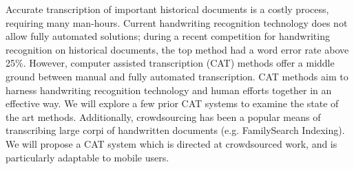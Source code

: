 \documentclass[conference]{IEEEtran}
\begin{document}




\maketitle






%
\IEEEpeerreviewmaketitle



Accurate transcription of important historical documents is a costly process, requiring many man-hours. Current handwriting recognition technology does not allow fully automated solutions; during a recent competition for handwriting recognition on historical documents, the top method had a word error rate above 25\%\cite{icdarComp2015}.  However, computer assisted transcription (CAT) methods offer a middle ground between manual and fully automated transcription. CAT methods aim to harness handwriting recognition technology and human efforts together in an effective way. We will explore a few prior CAT systems to examine the state of the art methods. Additionally, crowdsourcing has been a popular means of transcribing large corpi of handwritten documents (e.g. FamilySearch Indexing). We will propose a CAT system which is directed at crowdsourced work, and is particularly adaptable to mobile users.
\end{document}
